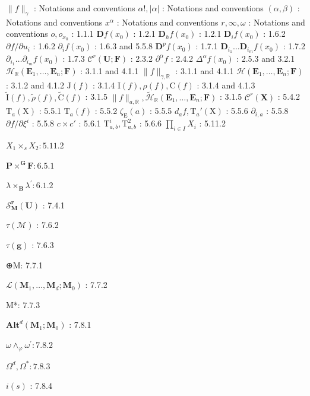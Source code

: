 \(\| f \|_{\gamma}\) : Notations and conventions \(\alpha!, |\alpha|\) : Notations and conventions \((\alpha, \beta)\) : Notations and conventions \(x^{\alpha}\) : Notations and conventions \(r, \infty, \omega\) : Notations and conventions \(o, o_{x_0}\) : 1.1.1 \(\mathbf{D}f(x_0)\) : 1.2.1 \(\mathbf{D}_h f(x_0)\) : 1.2.1 \(\mathbf{D}_i f(x_0)\) : 1.6.2 \(\partial f / \partial u_i\) : 1.6.2 \(\partial_i f(x_0)\) : 1.6.3 and 5.5.8 \(\mathbf{D}^p f(x_0)\) : 1.7.1 \(\mathbf{D}_{i_1} \ldots \mathbf{D}_{i_m} f(x_0)\) : 1.7.2 \(\partial_{i_1} \ldots \partial_{i_m} f(x_0)\) : 1.7.3 \(\mathcal{C}^r (\mathbf{U};\mathbf{F})\) : 2.3.2 \(\partial^\alpha f\) : 2.4.2 \(\Delta^\alpha f(x_0)\) : 2.5.3 and 3.2.1 \(\mathcal{H}_{\mathbb{R}}(\mathbf{E}_1,\dots,\mathbf{E}_n;\mathbf{F})\) : 3.1.1 and 4.1.1 \(\| f \|_{\gamma,\mathbb{R}}\) : 3.1.1 and 4.1.1 \(\mathcal{H}(\mathbf{E}_1,\dots,\mathbf{E}_n;\mathbf{F})\) : 3.1.2 and 4.1.2 \(\mathrm{J}(f)\) : 3.1.4 \(\mathrm{I}(f), \rho(f), \mathrm{C}(f)\) : 3.1.4 and 4.1.3 \(\tilde{\mathrm{I}}(f), \tilde{\rho}(f), \tilde{\mathrm{C}}(f)\) : 3.1.5 \(\| f \|_{a,\mathbb{R}}, \tilde{\mathcal{H}}_{\mathbb{R}}(\mathbf{E}_1,\dots,\mathbf{E}_n;\mathbf{F})\) : 3.1.5 \(\mathcal{C}^r (\mathbf{X})\) : 5.4.2 \(\mathrm{T}_a(\mathrm{X})\) : 5.5.1 \(\mathrm{T}_a(f)\) : 5.5.2 \(\zeta_{\mathrm{E}}(a)\) : 5.5.5 \(d_a f, \mathrm{T}_a'(\mathrm{X})\) : 5.5.6 \(\partial_{i,a}\) : 5.5.8 \(\partial f / \partial\xi^i\) : 5.5.8 \(c \times c'\) : 5.6.1 \(\mathrm{T}_{a,b}^i, \mathrm{T}_{a,b}^2\) : 5.6.6 \(\prod_{i \in I} X_i\) : 5.11.2

\(X_{1} \times_{s} X_{2}: 5.11.2\)

\(\mathbf{P} \times^{\mathbf{G}} \mathbf{F}: 6.5.1\)

\(\lambda \times_{\mathbf{B}}\lambda^{\prime}:6.1.2\)

\(\mathcal{S}_{\mathbf{M}}^{\boldsymbol{r}}(\mathbf{U})\) : 7.4.1

\(\tau (\mathcal{M})\) : 7.6.2

\(\tau (\mathbf{g})\) : 7.6.3

⊕M: 7.7.1

\(\mathcal{L}(\mathbf{M}_1,\dots ,\mathbf{M}_d;\mathbf{M}_0)\) : 7.7.2

M*: 7.7.3

\(\mathbf{Alt}^d (\mathbf{M}_1;\mathbf{M}_0)\) : 7.8.1

\(\omega \wedge_{\varphi}\omega^{\prime}:7.8.2\)

\(\Omega^d,\Omega^* :7.8.3\)

\(i(s)\) : 7.8.4

